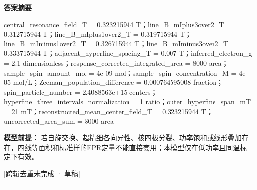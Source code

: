 \documentclass[UTF8,11pt,a4paper]{ctexart}
\begin{document}
\noindent\textbf{答案摘要}\par
central\_resonance\_field\_T = 0.323215944 T；line\_B\_mIplus3over2\_T = 0.312715944 T；line\_B\_mIplus1over2\_T = 0.319715944 T；line\_B\_mIminus1over2\_T = 0.326715944 T；line\_B\_mIminus3over2\_T = 0.333715944 T；adjacent\_hyperfine\_spacing\_T = 0.007 T；inferred\_electron\_g = 2.1 dimensionless；response\_corrected\_integrated\_area = 8000 area；sample\_spin\_amount\_mol = 4e-09 mol；sample\_spin\_concentration\_M = 4e-05 mol/L；Zeeman\_population\_difference = 0.000764595008 fraction；spin\_particle\_number = 2.4088563e+15 centers；hyperfine\_three\_intervals\_normalization = 1 ratio；outer\_hyperfine\_span\_mT = 21 mT；reconstructed\_mean\_center\_field\_T = 0.323215944 T；uncorrected\_area\_sum = 8000 area\par
\noindent\textbf{模型前提：}
若自旋交换、超精细各向异性、核四极分裂、功率饱和或线形叠加存在，四线等面积和标准样的EPR定量不能直接套用；本模型仅在低功率且同温标定下有效。\par
\noindent\textcolor{red!65!black}{[跨辑去重未完成 · 草稿]} \par
\medskip\hrule\medskip
{}
\end{document}
